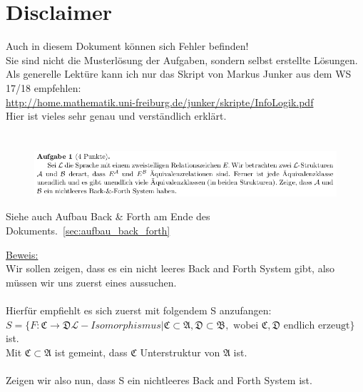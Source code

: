\documentclass[a4paper]{scrartcl}
\begin{document}
\section*{Disclaimer}%
\label{sec:disclaimer}
Auch in diesem Dokument können sich Fehler befinden!\\
Sie sind nicht die Musterlösung der Aufgaben, sondern selbst erstellte Lösungen.\\

Als generelle Lektüre kann ich nur das Skript von Markus Junker aus dem WS 17/18 empfehlen:\\
\url{http://home.mathematik.uni-freiburg.de/junker/skripte/InfoLogik.pdf}\\
Hier ist vieles sehr genau und verständlich erklärt.

\section*{}%
\label{sec:aufgabe_1}

    \begin{figure}[H]
        \centering
        \includegraphics[scale=0.6]{./A-1.png}
        \label{fig:}
    \end{figure} 

    Siehe auch Aufbau Back \& Forth am Ende des Dokuments.~\ref{sec:aufbau_back_forth}

    \underline{Beweis:}\\
    Wir sollen zeigen, dass es ein nicht leeres Back and Forth System gibt, also müssen wir uns zuerst eines aussuchen.\\
    \\Hierfür empfiehlt es sich zuerst mit folgendem S anzufangen:\\
    $S = \{F: \mathfrak{C} \rightarrow \mathfrak{D} \mathscr{L}-Isomorphismus| \mathfrak{C} \subset \mathfrak{A}, \mathfrak{D} \subset \mathfrak{B},
    \text{ wobei  }\mathfrak{C}, \mathfrak{D} \text{ endlich erzeugt}\}$ ist.\\
    Mit $\mathfrak{C} \subset \mathfrak{A}$ ist gemeint, dass $\mathfrak{C}$ Unterstruktur von $\mathfrak{A}$ ist.\\

    \\Zeigen wir also nun, dass S ein nichtleeres Back and Forth System ist. 
\end{document}
